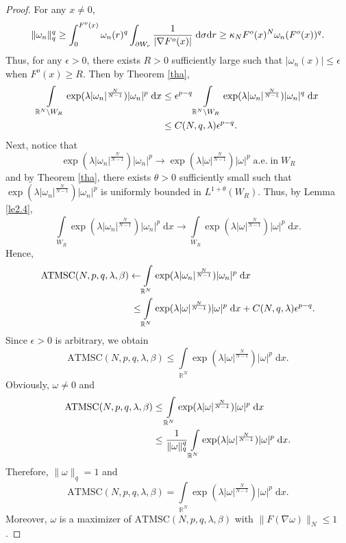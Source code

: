 \documentclass[11pt]{article}
\theoremstyle{plain}
\numberwithin{equation}{section}
\newcommand{\R}{\mathbb{R}}
\begin{document}
\begin{proof}
For any $x\not=0$,
\begin{align}
    \|\omega_{n}\|_{q}^{q}\geq\int_{0}^{F^{o}(x)}\omega_{n}(r)^{q}\int_{\partial W_{r}}\frac{1}{\lvert\nabla F^{o}(x)\rvert}\;\mathrm{d}\sigma\mathrm{d}r\geq\kappa_{N}F^{o}(x)^{N}\omega_{n}(F^{o}(x))^{q}.\notag
\end{align}
Thus, for any $\epsilon>0$, there exists $R>0$ sufficiently large such that $\lvert\omega_{n}(x)\rvert\leq\epsilon$ when $F^{o}(x)\geq R$. Then by Theorem \ref{tha},
\begin{align}
    \int\limits_{\R^{N}\backslash W_{R}}\exp(\lambda\lvert \omega_{n}\rvert^{\frac{N}{N-1}})\lvert \omega_{n}\rvert^{p}\;\mathrm{d}x&\leq\epsilon^{p-q}\int\limits_{\R^{N}\backslash W_{R}}\exp(\lambda\lvert \omega_{n}\rvert^{\frac{N}{N-1}})\lvert \omega_{n}\rvert^{q}\;\mathrm{d}x\notag\\
    &\leq C(N,q,\lambda)\epsilon^{p-q}.\notag
\end{align}
Next, notice that
$$
\exp(\lambda\lvert \omega_{n}\rvert^{\frac{N}{N-1}})\lvert \omega_{n}\rvert^{p}\rightarrow\exp(\lambda\lvert \omega\rvert^{\frac{N}{N-1}})\lvert \omega\rvert^{p}\;\mathrm{a.e.}\;\mathrm{in}\;W_{R}
$$
and by Theorem \ref{tha}, there exists $\theta>0$ sufficiently small such that $\exp(\lambda\lvert \omega_{n}\rvert^{\frac{N}{N-1}})\lvert \omega_{n}\rvert^{p}$ is uniformly bounded in $L^{1+\theta}(W_{R})$. Thus, by Lemma \ref{le2.4},
$$
\int\limits_{W_{R}}\exp(\lambda\lvert \omega_{n}\rvert^{\frac{N}{N-1}})\lvert \omega_{n}\rvert^{p}\;\mathrm{d}x\rightarrow\int\limits_{W_{R}}\exp(\lambda\lvert \omega\rvert^{\frac{N}{N-1}})\lvert \omega\rvert^{p}\;\mathrm{d}x.
$$
Hence,
\begin{align}
    \mathrm{ATMSC}(N,p,q,\lambda,\beta)\leftarrow&\int\limits_{\R^{N}}\exp(\lambda\lvert \omega_{n}\rvert^{\frac{N}{N-1}})\lvert \omega_{n}\rvert^{p}\;\mathrm{d}x\notag\\
    \leq&\int\limits_{\R^{N}}\exp(\lambda\lvert \omega\rvert^{\frac{N}{N-1}})\lvert \omega\rvert^{p}\;\mathrm{d}x+C(N,q,\lambda)\epsilon^{p-q}.\notag
\end{align}
Since $\epsilon>0$ is arbitrary, we obtain
$$
\mathrm{ATMSC}(N,p,q,\lambda,\beta)\leq\int\limits_{\R^{N}}\exp(\lambda\lvert \omega\rvert^{\frac{N}{N-1}})\lvert \omega\rvert^{p}\;\mathrm{d}x.
$$
Obviously, $\omega\not=0$ and
\begin{align}
    \mathrm{ATMSC}(N,p,q,\lambda,\beta)&\leq\int\limits_{\R^{N}}\exp(\lambda\lvert \omega\rvert^{\frac{N}{N-1}})\lvert \omega\rvert^{p}\;\mathrm{d}x\notag\\
    &\leq\frac{1}{\|\omega\|_{q}^{q}}\int\limits_{\R^{N}}\exp(\lambda\lvert \omega\rvert^{\frac{N}{N-1}})\lvert \omega\rvert^{p}\;\mathrm{d}x.\notag
\end{align}
Therefore, $\|\omega\|_{q}=1$ and
$$
\mathrm{ATMSC}(N,p,q,\lambda,\beta)=\int\limits_{\R^{N}}\exp(\lambda\lvert \omega\rvert^{\frac{N}{N-1}})\lvert \omega\rvert^{p}\;\mathrm{d}x.
$$
Moreover, $\omega$ is a maximizer of $\mathrm{ATMSC}(N,p,q,\lambda,\beta)$ with $\|F(\nabla\omega)\|_{N}\leq1$.


\end{proof}
\end{document}
